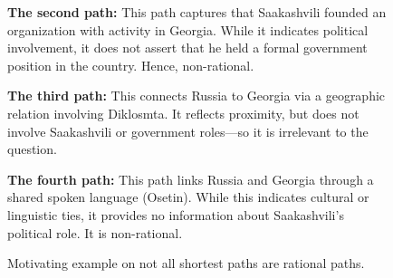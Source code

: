 \begin{figure}[t]
\begin{tcolorbox}[colback=gray!5!white,
                  colframe=gray!75!black,
                  title=WebQTrn-1399\_64fc62dc06d16e612aafb00889d4ada1]
{\textbf{The second path:} This path captures that Saakashvili founded an organization with activity in Georgia. While it indicates political involvement, it does not assert that he held a formal government position in the country. Hence, non-rational.\par\vspace{6pt}

\textbf{The third path:} This connects Russia to Georgia via a geographic relation involving Diklosmta. It reflects proximity, but does not involve Saakashvili or government roles—so it is irrelevant to the question.\par\vspace{6pt}

\textbf{The fourth path:} This path links Russia and Georgia through a shared spoken language (Osetin). While this indicates cultural or linguistic ties, it provides no information about Saakashvili’s political role. It is non-rational.\par\vspace{6pt}
\par}

\end{tcolorbox}
\caption{Motivating example on not all shortest paths are rational paths.}
\label{fig:type1_no6}
\end{figure}


